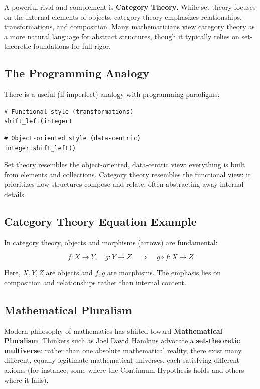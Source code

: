 A powerful rival and complement is \textbf{Category Theory}.
While set theory focuses on the internal elements of objects, category theory emphasizes relationships, transformations, and composition.
Many mathematicians view category theory as a more natural language for abstract structures, though it typically relies on set-theoretic foundations for full rigor.

\subsection*{The Programming Analogy}

There is a useful (if imperfect) analogy with programming paradigms:

\begin{verbatim}
# Functional style (transformations)
shift_left(integer)
\end{verbatim}

\begin{verbatim}
# Object-oriented style (data-centric)
integer.shift_left()
\end{verbatim}

Set theory resembles the object-oriented, data-centric view: everything is built from elements and collections.
Category theory resembles the functional view: it prioritizes how structures compose and relate, often abstracting away internal details.

\subsection*{Category Theory Equation Example}

In category theory, objects and morphisms (arrows) are fundamental:

\[
f: X \to Y, \quad g: Y \to Z \quad \Rightarrow \quad g \circ f: X \to Z
\]

Here, $X, Y, Z$ are objects and $f, g$ are morphisms.
The emphasis lies on composition and relationships rather than internal content.

\subsection*{Mathematical Pluralism}

Modern philosophy of mathematics has shifted toward \textbf{Mathematical Pluralism}.
Thinkers such as Joel David Hamkins advocate a \textbf{set-theoretic multiverse}: rather than one absolute mathematical reality, there exist many different, equally legitimate mathematical universes, each satisfying different axioms (for instance, some where the Continuum Hypothesis holds and others where it fails).

